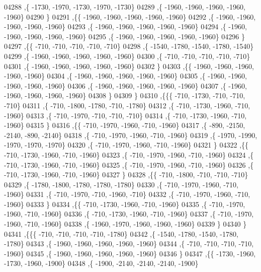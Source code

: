 \begin{DoxyCode}
04288     ,\{ -1730, -1970, -1730, -1970, -1730\}
04289     ,\{ -1960, -1960, -1960, -1960, -1960\}
04290     \}
04291    ,\{\{ -1960, -1960, -1960, -1960, -1960\}
04292     ,\{ -1960, -1960, -1960, -1960, -1960\}
04293     ,\{ -1960, -1960, -1960, -1960, -1960\}
04294     ,\{ -1960, -1960, -1960, -1960, -1960\}
04295     ,\{ -1960, -1960, -1960, -1960, -1960\}
04296     \}
04297    ,\{\{  -710,  -710,  -710,  -710,  -710\}
04298     ,\{ -1540, -1780, -1540, -1780, -1540\}
04299     ,\{ -1960, -1960, -1960, -1960, -1960\}
04300     ,\{  -710,  -710,  -710,  -710,  -710\}
04301     ,\{ -1960, -1960, -1960, -1960, -1960\}
04302     \}
04303    ,\{\{ -1960, -1960, -1960, -1960, -1960\}
04304     ,\{ -1960, -1960, -1960, -1960, -1960\}
04305     ,\{ -1960, -1960, -1960, -1960, -1960\}
04306     ,\{ -1960, -1960, -1960, -1960, -1960\}
04307     ,\{ -1960, -1960, -1960, -1960, -1960\}
04308     \}
04309    \}
04310   ,\{\{\{  -710, -1730,  -710,  -710,  -710\}
04311     ,\{  -710, -1800, -1780,  -710, -1780\}
04312     ,\{  -710, -1730, -1960,  -710, -1960\}
04313     ,\{  -710, -1970,  -710,  -710,  -710\}
04314     ,\{  -710, -1730, -1960,  -710, -1960\}
04315     \}
04316    ,\{\{  -710, -1970, -1960,  -710, -1960\}
04317     ,\{  -890, -2150, -2140,  -890, -2140\}
04318     ,\{  -710, -1970, -1960,  -710, -1960\}
04319     ,\{ -1970, -1990, -1970, -1970, -1970\}
04320     ,\{  -710, -1970, -1960,  -710, -1960\}
04321     \}
04322    ,\{\{  -710, -1730, -1960,  -710, -1960\}
04323     ,\{  -710, -1970, -1960,  -710, -1960\}
04324     ,\{  -710, -1730, -1960,  -710, -1960\}
04325     ,\{  -710, -1970, -1960,  -710, -1960\}
04326     ,\{  -710, -1730, -1960,  -710, -1960\}
04327     \}
04328    ,\{\{  -710, -1800,  -710,  -710,  -710\}
04329     ,\{ -1780, -1800, -1780, -1780, -1780\}
04330     ,\{  -710, -1970, -1960,  -710, -1960\}
04331     ,\{  -710, -1970,  -710, -1960,  -710\}
04332     ,\{  -710, -1970, -1960,  -710, -1960\}
04333     \}
04334    ,\{\{  -710, -1730, -1960,  -710, -1960\}
04335     ,\{  -710, -1970, -1960,  -710, -1960\}
04336     ,\{  -710, -1730, -1960,  -710, -1960\}
04337     ,\{  -710, -1970, -1960,  -710, -1960\}
04338     ,\{ -1960, -1970, -1960, -1960, -1960\}
04339     \}
04340    \}
04341   ,\{\{\{  -710,  -710,  -710,  -710, -1780\}
04342     ,\{ -1540, -1780, -1540, -1780, -1780\}
04343     ,\{ -1960, -1960, -1960, -1960, -1960\}
04344     ,\{  -710,  -710,  -710,  -710, -1960\}
04345     ,\{ -1960, -1960, -1960, -1960, -1960\}
04346     \}
04347    ,\{\{ -1730, -1960, -1730, -1960, -1900\}
04348     ,\{ -1900, -2140, -2140, -2140, -1900\}

\end{DoxyCode}
